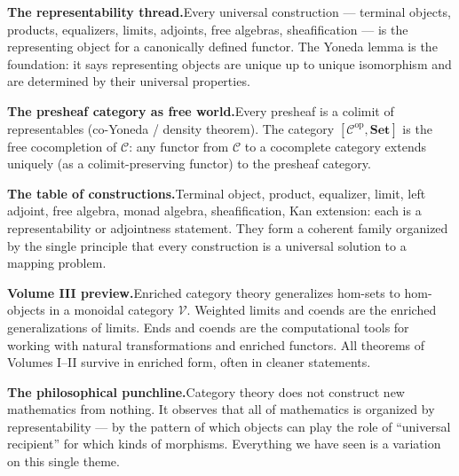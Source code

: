 \begin{summarybox}
\textbf{The representability thread.}\quad Every universal construction
--- terminal objects, products, equalizers, limits, adjoints, free
algebras, sheafification --- is the representing object for a canonically
defined functor. The Yoneda lemma is the foundation: it says representing
objects are unique up to unique isomorphism and are determined by their
universal properties.

\textbf{The presheaf category as free world.}\quad Every presheaf is a
colimit of representables (co-Yoneda / density theorem). The category
$[\mathcal{C}^{\mathrm{op}}, \mathbf{Set}]$ is the free cocompletion of
$\mathcal{C}$: any functor from $\mathcal{C}$ to a cocomplete category
extends uniquely (as a colimit-preserving functor) to the presheaf
category.

\textbf{The table of constructions.}\quad Terminal object, product,
equalizer, limit, left adjoint, free algebra, monad algebra, sheafification,
Kan extension: each is a representability or adjointness statement. They
form a coherent family organized by the single principle that every
construction is a universal solution to a mapping problem.

\textbf{Volume III preview.}\quad Enriched category theory generalizes
hom-sets to hom-objects in a monoidal category $\mathcal{V}$. Weighted
limits and coends are the enriched generalizations of limits. Ends and
coends are the computational tools for working with natural transformations
and enriched functors. All theorems of Volumes I--II survive in enriched
form, often in cleaner statements.

\textbf{The philosophical punchline.}\quad Category theory does not
construct new mathematics from nothing. It observes that all of mathematics
is organized by representability --- by the pattern of which objects can
play the role of ``universal recipient'' for which kinds of morphisms.
Everything we have seen is a variation on this single theme.
\end{summarybox}
